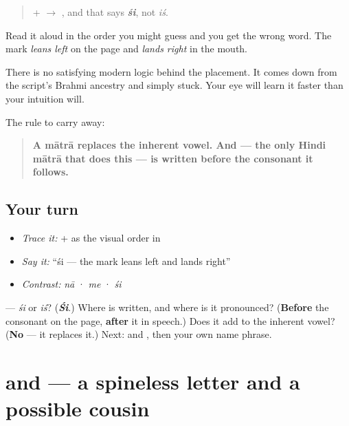 \begin{quote}
 +  $\to$ \textbf{}, and that says \emph{\textbf{śi}}, not \emph{iś}.
\end{quote}

Read it aloud in the order you might guess and you get the wrong word. The mark \emph{leans left} on the page and \emph{lands right} in the mouth.

There is no satisfying modern logic behind the placement. It comes down from the script's Brahmi ancestry and simply stuck. Your eye will learn it faster than your intuition will.

The rule to carry away:

\begin{quote}
\textbf{A mātrā replaces the inherent vowel. And  — the only Hindi mātrā that does this — is written before the consonant it follows.}
\end{quote}

\subsection*{Your turn}
\begin{itemize}
\raggedright
  \item \emph{Trace it:}  +  as the visual order in \textbf{}
  \item \emph{Say it:} \textquotedblleft{}śi — the mark leans left and lands right\textquotedblright{}
  \item \emph{Contrast:} \textbf{} \emph{nā} · \textbf{} \emph{me} · \textbf{} \emph{śi}
\end{itemize}

\begin{tcolorbox}[breakable,colback=teal!4,colframe=teal!35!black,title={Before you move on}]
\textbf{} — \emph{śi} or \emph{iś}? (\emph{\textbf{Śi}}.) Where is  written, and where is it pronounced? (\textbf{Before} the consonant on the page, \textbf{after} it in speech.) Does it add to the inherent vowel? (\textbf{No} — it replaces it.) Next:  and , then your own name phrase.
\end{tcolorbox}
\section[\texorpdfstring{\hi{र}, \hi{स} (ra, sa)}{र, स (ra, sa)}]{ and  — a spineless letter and a possible cousin}

\label{lesson:HI-W04-ra-sa-mera-naam}



